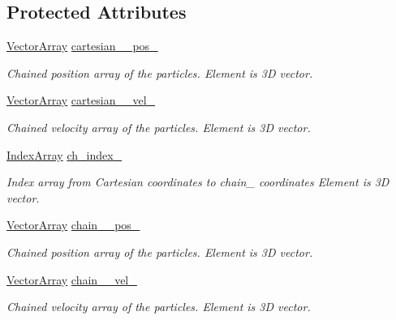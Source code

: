 \subsection*{Protected Attributes}
\begin{DoxyCompactItemize}
\item 
\mbox{\hyperlink{class_space_h_1_1_vel_indep_particles_aa9983058940249df8b00fa800e8cbad2}{Vector\+Array}} \mbox{\hyperlink{class_space_h_1_1_vel_indep_chain_particles_ae1479bfdab0d0676ee500f878698a75a}{cartesian_\+\_\+pos\+\_\+}}
\begin{DoxyCompactList}\small\item\em Chained position array of the particles. Element is 3D vector. \end{DoxyCompactList}\item 
\mbox{\hyperlink{class_space_h_1_1_vel_indep_particles_aa9983058940249df8b00fa800e8cbad2}{Vector\+Array}} \mbox{\hyperlink{class_space_h_1_1_vel_indep_chain_particles_a8634735aa331abbdd5befc3d208b11eb}{cartesian_\+\_\+vel\+\_\+}}
\begin{DoxyCompactList}\small\item\em Chained velocity array of the particles. Element is 3D vector. \end{DoxyCompactList}\item 
\mbox{\hyperlink{class_space_h_1_1_vel_indep_chain_particles_a48b9183f8d68fe8af42bf405125d450c}{Index\+Array}} \mbox{\hyperlink{class_space_h_1_1_vel_indep_chain_particles_a4801898e53bf6ece4ed588e03646b8a8}{ch\+\_\+index\+\_\+}}
\begin{DoxyCompactList}\small\item\em Index array from Cartesian coordinates to chain_ coordinates Element is 3D vector. \end{DoxyCompactList}\item
\mbox{\hyperlink{class_space_h_1_1_vel_indep_particles_aa9983058940249df8b00fa800e8cbad2}{Vector\+Array}} \mbox{\hyperlink{class_space_h_1_1_vel_indep_chain_particles_a6426404ff1098f28e34b9867c3b64e0c}{chain_\+\_\+pos\+\_\+}}
\begin{DoxyCompactList}\small\item\em Chained position array of the particles. Element is 3D vector. \end{DoxyCompactList}\item 
\mbox{\hyperlink{class_space_h_1_1_vel_indep_particles_aa9983058940249df8b00fa800e8cbad2}{Vector\+Array}} \mbox{\hyperlink{class_space_h_1_1_vel_indep_chain_particles_a79106719ec89861a02086b0a52eced21}{chain_\+\_\+vel\+\_\+}}
\begin{DoxyCompactList}\small\item\em Chained velocity array of the particles. Element is 3D vector. \end{DoxyCompactList}\end{DoxyCompactItemize}
